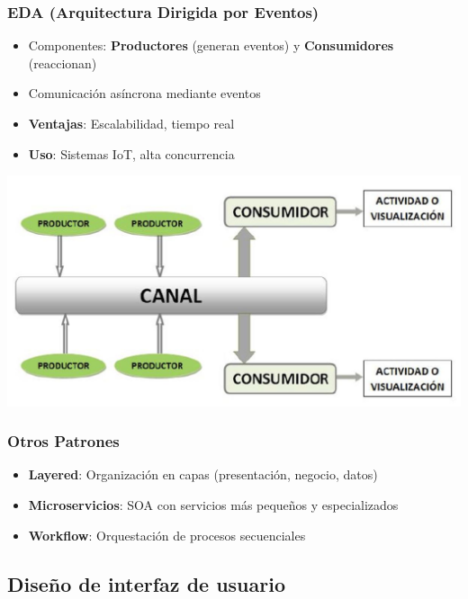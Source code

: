 \subsubsection{EDA (Arquitectura Dirigida por Eventos)}
\begin{itemize}
    \item Componentes: \textbf{Productores} (generan eventos) y \textbf{Consumidores} (reaccionan)
    \item Comunicación asíncrona mediante eventos
    \item \textbf{Ventajas}: Escalabilidad, tiempo real
    \item \textbf{Uso}: Sistemas IoT, alta concurrencia
\end{itemize}
\begin{minipage}{0.5\textwidth}
    \includegraphics[width=\linewidth]{imagenes/eda}
\end{minipage}

\subsubsection{Otros Patrones}
\begin{itemize}
    \item \textbf{Layered}: Organización en capas (presentación, negocio, datos)
    \item \textbf{Microservicios}: SOA con servicios más pequeños y especializados
    \item \textbf{Workflow}: Orquestación de procesos secuenciales
\end{itemize}

\subsection{Diseño de interfaz de usuario}\label{subsec:diseno-de-interfaz-de-usuario}

